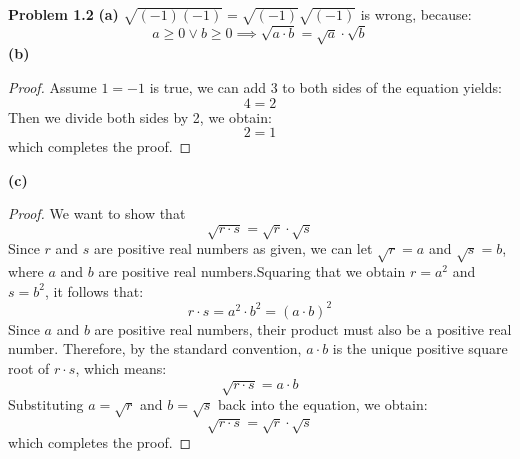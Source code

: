 \documentclass[12pt]{article}
\begin{document}
\noindent \textbf{Problem 1.2}
\smallbreak
\noindent \textbf{(a)}
\smallbreak
$\sqrt{(-1)(-1)} = \sqrt{(-1)}\sqrt{(-1)}$ is wrong, because: $$ a \ge 0 \lor b \ge 0 \implies \sqrt{a \cdot b} = \sqrt{a} \cdot \sqrt{b}$$
\noindent \textbf{(b)}
\smallbreak
\begin{proof}
Assume $1 = -1$ is true, we can add 3 to both sides of the equation yields: $$4 = 2$$ Then we divide both sides by 2, we obtain: $$2 = 1$$ which completes the proof.
\end{proof}

\noindent \textbf{(c)}
\smallbreak
\begin{proof}
    We want to show that $$\sqrt{r \cdot s} = \sqrt{r} \cdot \sqrt{s}$$
    Since $r$ and $s$ are positive real numbers as given, we can let $\sqrt{r} = a$ and $\sqrt{s} = b$, where $a$ and $b$ are positive real numbers.Squaring that we obtain $r = a^2$ and $s = b^2$, it follows that: $$r \cdot s = a^2 \cdot b^2 = (a \cdot b)^2$$
    Since $a$ and $b$ are positive real numbers, their product must also be a positive real number. Therefore, by the standard convention, $a \cdot b$ is the unique positive square root of $r \cdot s$, which means:$$\sqrt{r \cdot s} = a \cdot b$$
    Substituting $a = \sqrt{r}$ and $b = \sqrt{s}$ back into the equation, we obtain:$$\sqrt{r \cdot s} = \sqrt{r} \cdot \sqrt{s}$$
    which completes the proof.
\end{proof}
\end{document}
